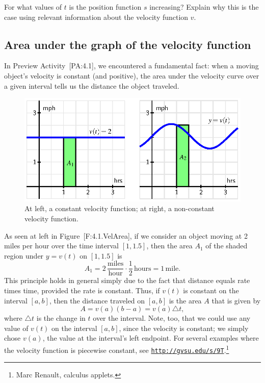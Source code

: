 For what values of \(t\) is the position function \(s\) increasing?
Explain why this is the case using relevant information about the
velocity function \(v\).

\subsection*{Area under the graph of the velocity
function}\label{area-under-the-graph-of-the-velocity-function}

In Preview Activity~{[}PA:4.1{]}, we encountered a fundamental fact:
when a moving object's velocity is constant (and positive), the area
under the velocity curve over a given interval tells us the distance the
object traveled.

\begin{figure}[htbp]
\centering
\includegraphics{figures/4_1_VelArea.eps}
\caption{At left, a constant velocity function; at right, a non-constant
velocity function.{}}
\end{figure}

As seen at left in Figure~{[}F:4.1.VelArea{]}, if we consider an object
moving at 2 miles per hour over the time interval \([1,1.5]\), then the
area \(A_1\) of the shaded region under \(y = v(t)\) on \([1,1.5]\) is
\[A _1= 2 \, \frac{\mbox{miles}}{\mbox{hour}} \cdot \frac{1}{2} \, \mbox{hours} = 1 \, \mbox{mile}.\]
This principle holds in general simply due to the fact that distance
equals rate times time, provided the rate is constant. Thus, if \(v(t)\)
is constant on the interval \([a,b]\), then the distance traveled on
\([a,b]\) is the area \(A\) that is given by
\[A = v(a) (b-a) = v(a) \triangle t,\] where \(\triangle t\) is the
change in \(t\) over the interval. Note, too, that we could use any
value of \(v(t)\) on the interval \([a,b]\), since the velocity is
constant; we simply chose \(v(a)\), the value at the interval's left
endpoint. For several examples where the velocity function is piecewise
constant, see
\href{http://gvsu.edu/s/9T}{\texttt{http://gvsu.edu/s/9T}}.\footnote{Marc
  Renault, calculus applets.}

